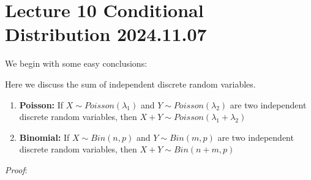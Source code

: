 \documentclass{article}
\begin{document}
\section{Lecture 10 Conditional Distribution 2024.11.07}
We begin with some easy conclusions:
\begin{theorem}
Here we discuss the sum of independent discrete random variables.
\begin{enumerate}
    \item \textbf{Poisson: }If $X \sim Poisson(\lambda_1)$ and $Y \sim Poisson(\lambda_2)$ are two independent discrete random variables, then $X+Y \sim Poisson(\lambda_1 + \lambda_2)$
    \item \textbf{Binomial: }If $X \sim Bin(n,p)$ and $Y \sim Bin(m,p)$ are two independent discrete random variables, then $X + Y \sim Bin( n+m, p)$

\end{enumerate}

\end{theorem}
\emph{Proof}:
\end{document}
